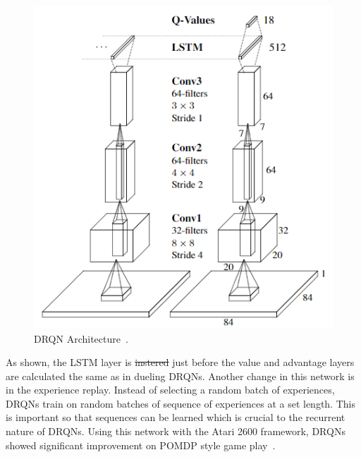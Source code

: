 \documentclass[12pt,american]{report}
\providecommand{\DIFaddtex}[1]{{\protect\color{blue}\uwave{#1}}} %
\providecommand{\DIFdeltex}[1]{{\protect\color{red}\sout{#1}}}                      %
\providecommand{\DIFaddbegin}{} %
\providecommand{\DIFaddend}{} %
\providecommand{\DIFdelbegin}{} %
\providecommand{\DIFdelend}{} %
\providecommand{\DIFadd}[1]{\texorpdfstring{\DIFaddtex{#1}}{#1}} %
\providecommand{\DIFdel}[1]{\texorpdfstring{\DIFdeltex{#1}}{}} %
\newcommand{\DIFscaledelfig}{0.5}
\newlength{\DIFdelgraphicswidth} %
\newlength{\DIFdelgraphicsheight} %
\newcommand{\DIFaddincludegraphics}[2][]{{\color{blue}\fbox{\DIFOincludegraphics[#1]{#2}}}} %
\newcommand{\DIFdelincludegraphics}[2][]{%
\sbox{\DIFdelgraphicsbox}{\DIFOincludegraphics[#1]{#2}}%
\settoboxwidth{\DIFdelgraphicswidth}{\DIFdelgraphicsbox} %
\settoboxtotalheight{\DIFdelgraphicsheight}{\DIFdelgraphicsbox} %
\scalebox{\DIFscaledelfig}{%
\parbox[b]{\DIFdelgraphicswidth}{\usebox{\DIFdelgraphicsbox}\\[-\baselineskip] \rule{\DIFdelgraphicswidth}{0em}}\llap{\resizebox{\DIFdelgraphicswidth}{\DIFdelgraphicsheight}{%
\setlength{\unitlength}{\DIFdelgraphicswidth}%
\begin{picture}(1,1)%
\thicklines\linethickness{2pt} %
{\color[rgb]{1,0,0}\put(0,0){\framebox(1,1){}}}%
{\color[rgb]{1,0,0}\put(0,0){\line( 1,1){1}}}%
{\color[rgb]{1,0,0}\put(0,1){\line(1,-1){1}}}%
\end{picture}%
}\hspace*{3pt}}} %
} %
\DeclareRobustCommand{\DIFaddbegin}{\DIFOaddbegin \let\includegraphics\DIFaddincludegraphics} %
\DeclareRobustCommand{\DIFaddend}{\DIFOaddend \let\includegraphics\DIFOincludegraphics} %
\DeclareRobustCommand{\DIFdelbegin}{\DIFOdelbegin \let\includegraphics\DIFdelincludegraphics} %
\DeclareRobustCommand{\DIFdelend}{\DIFOaddend \let\includegraphics\DIFOincludegraphics} %
\begin{document}
\begin{figure}
\centering
\includegraphics[scale=.85]{images/drqn-arch.png}
\caption{DRQN Architecture~\cite{HausknechtDRQN}.}
\label{fig:drqn-arch}
\end{figure}

As shown, the LSTM layer is \DIFdelbegin \DIFdel{instered }\DIFdelend \DIFaddbegin \DIFadd{inserted }\DIFaddend just before the value and advantage layers are calculated the same as in dueling DRQNs. Another change in this network is in the experience replay.  Instead of selecting a random batch of experiences, DRQNs train on random batches of sequence of experiences at a set length.  This is important so that sequences can be learned which is crucial to the recurrent nature of DRQNs. Using this network with the Atari 2600 framework, DRQNs showed significant improvement on POMDP style game play~\cite{HausknechtDRQN}. 
\end{document}
